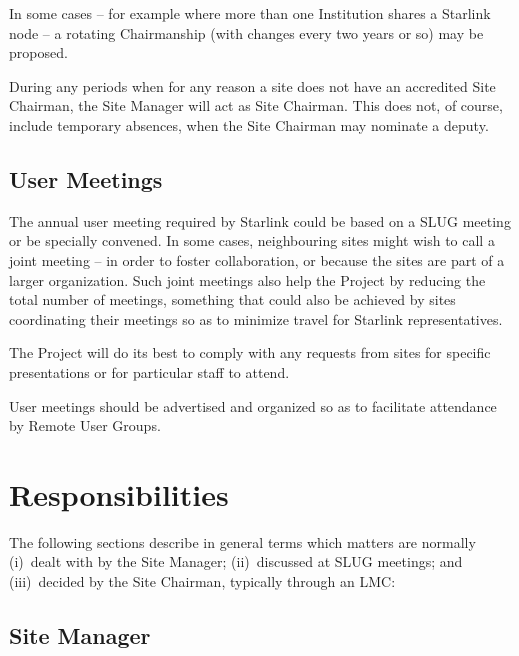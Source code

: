 \documentclass[twoside,11pt]{article}
\begin{document}
In some cases -- for example where more than one Institution
shares a Starlink node -- a rotating Chairmanship (with
changes every two years or so) may be proposed.

During any periods when for any reason a site does not have
an accredited Site Chairman, the Site Manager will act as Site Chairman.
This does not, of course, include temporary absences, when the
Site Chairman may nominate a deputy.

\subsection{User Meetings}

The annual user meeting required by Starlink could be based on a SLUG
meeting or be specially convened.  In some cases, neighbouring sites
might wish to call a joint meeting -- in order to foster collaboration,
or because the sites are part of a larger organization.  Such joint
meetings also help the Project by reducing the total number of
meetings, something that could also be achieved by sites coordinating
their meetings so as to minimize travel for Starlink representatives.

The Project will do its best to comply with any requests from
sites for specific presentations or for particular staff to attend.

User meetings should be advertised and organized so as to facilitate
attendance by Remote User Groups.

\section{Responsibilities}
The following sections describe in general terms
which matters are normally (i)~dealt with by the
Site Manager; (ii)~discussed at SLUG meetings; and
(iii)~decided by the Site Chairman, typically through an LMC:

\subsection{Site Manager}
\end{document}
